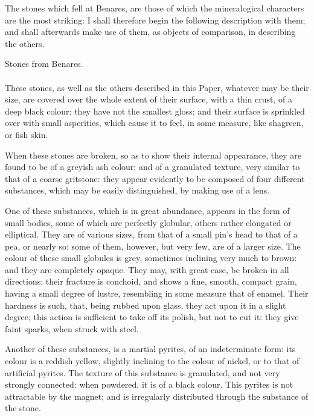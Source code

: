 \documentclass[a4paper, 12pt, oneside]{article}
\begin{document}
The stones which fell at Benares, are those of which the mineralogical characters are the most striking: I shall therefore begin the following description with them; and shall afterwards make use of them, as objects of comparison, in describing the others.
\begin{center}
Stones from Benares.
\end{center}
\paragraph{}
These stones, as well as the others described in this Paper, whatever may be their size, are covered over the whole extent of their surface, with a thin crust, of a deep black colour: they have not the smallest gloss; and their surface is sprinkled over with small asperities, which cause it to feel, in some measure, like shagreen, or fish skin.

When these stones are broken, so as to show their internal appearance, they are found to be of a greyish ash colour; and of a granulated texture, very similar to that of a coarse gritstone: they appear evidently to be composed of four different substances, which may be easily distinguished, by making use of a lens.

One of these substances, which is in great abundance, appears in the form of small bodies, some of which are perfectly globular, others rather elongated or elliptical. They are of various sizes, from that of a small pin's head to that of a pea, or nearly so: some of them, however, but very few, are of a larger size. The colour of these small globules is grey, sometimes inclining very much to brown: and they are completely opaque. They may, with great ease, be broken in all directions: their fracture is conchoid, and shows a fine, smooth, compact grain, having a small degree of lustre, resembling in some measure that of enamel. Their hardness is such, that, being rubbed upon glass, they act upon it in a slight degree; this action is sufficient to take off its polish, but not to cut it: they give faint sparks, when struck with steel.

Another of these substances, is a martial pyrites, of an indeterminate form: its colour is a reddish yellow, slightly inclining to the colour of nickel, or to that of artificial pyrites. The texture of this substance is granulated, and not very strongly connected: when powdered, it is of a black colour. This pyrites is not attractable by the magnet; and is irregularly distributed through the substance of the stone.
\end{document}
